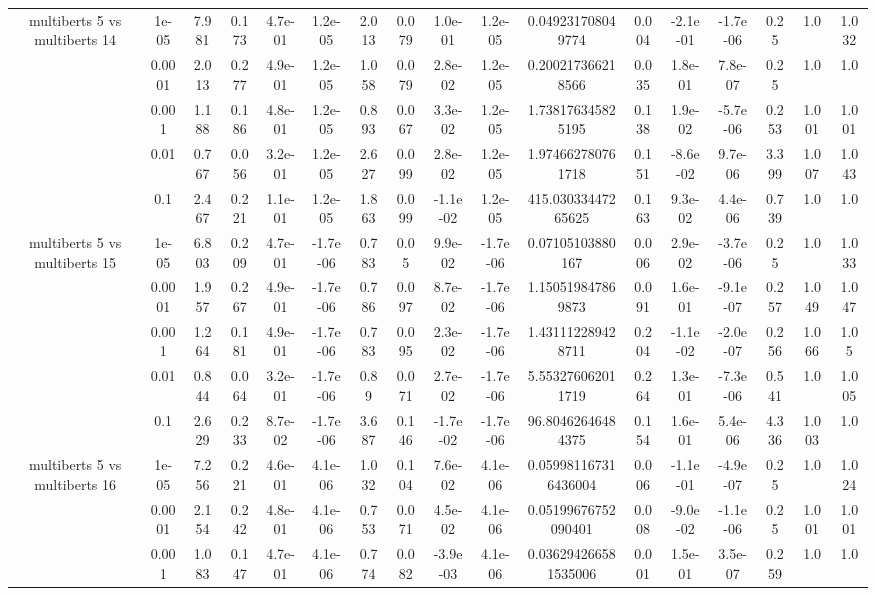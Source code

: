 \begin{tabular}{|c|c|c|c|c|c|c|c|c|c|c|c|c|c|c|c|c|}
\hline
\multirow{5}{*}{multiberts 5 vs multiberts 14} & 1e-05 & 7.981 & 0.173 & 4.7e-01 & 1.2e-05 & 2.013 & 0.079 & 1.0e-01 & 1.2e-05 & 0.049231708049774 & 0.004 & -2.1e-01 & -1.7e-06 & 0.25 & 1.0 & 1.032 \\
 & 0.0001 & 2.013 & 0.277 & 4.9e-01 & 1.2e-05 & 1.058 & 0.079 & 2.8e-02 & 1.2e-05 & 0.200217366218566 & 0.035 & 1.8e-01 & 7.8e-07 & 0.25 & 1.0 & 1.0 \\
 & 0.001 & 1.188 & 0.186 & 4.8e-01 & 1.2e-05 & 0.893 & 0.067 & 3.3e-02 & 1.2e-05 & 1.738176345825195 & 0.138 & 1.9e-02 & -5.7e-06 & 0.253 & 1.001 & 1.001 \\
 & 0.01 & 0.767 & 0.056 & 3.2e-01 & 1.2e-05 & 2.627 & 0.099 & 2.8e-02 & 1.2e-05 & 1.974662780761718 & 0.151 & -8.6e-02 & 9.7e-06 & 3.399 & 1.007 & 1.043 \\
 & 0.1 & 2.467 & 0.221 & 1.1e-01 & 1.2e-05 & 1.863 & 0.099 & -1.1e-02 & 1.2e-05 & 415.03033447265625 & 0.163 & 9.3e-02 & 4.4e-06 & 0.739 & 1.0 & 1.0 \\
\hline
\multirow{5}{*}{multiberts 5 vs multiberts 15} & 1e-05 & 6.803 & 0.209 & 4.7e-01 & -1.7e-06 & 0.783 & 0.05 & 9.9e-02 & -1.7e-06 & 0.07105103880167 & 0.006 & 2.9e-02 & -3.7e-06 & 0.25 & 1.0 & 1.033 \\
 & 0.0001 & 1.957 & 0.267 & 4.9e-01 & -1.7e-06 & 0.786 & 0.097 & 8.7e-02 & -1.7e-06 & 1.150519847869873 & 0.091 & 1.6e-01 & -9.1e-07 & 0.257 & 1.049 & 1.047 \\
 & 0.001 & 1.264 & 0.181 & 4.9e-01 & -1.7e-06 & 0.783 & 0.095 & 2.3e-02 & -1.7e-06 & 1.431112289428711 & 0.204 & -1.1e-02 & -2.0e-07 & 0.256 & 1.066 & 1.05 \\
 & 0.01 & 0.844 & 0.064 & 3.2e-01 & -1.7e-06 & 0.89 & 0.071 & 2.7e-02 & -1.7e-06 & 5.553276062011719 & 0.264 & 1.3e-01 & -7.3e-06 & 0.541 & 1.0 & 1.005 \\
 & 0.1 & 2.629 & 0.233 & 8.7e-02 & -1.7e-06 & 3.687 & 0.146 & -1.7e-02 & -1.7e-06 & 96.80462646484375 & 0.154 & 1.6e-01 & 5.4e-06 & 4.336 & 1.003 & 1.0 \\
\hline
\multirow{5}{*}{multiberts 5 vs multiberts 16} & 1e-05 & 7.256 & 0.221 & 4.6e-01 & 4.1e-06 & 1.032 & 0.104 & 7.6e-02 & 4.1e-06 & 0.059981167316436004 & 0.006 & -1.1e-01 & -4.9e-07 & 0.25 & 1.0 & 1.024 \\
 & 0.0001 & 2.154 & 0.242 & 4.8e-01 & 4.1e-06 & 0.753 & 0.071 & 4.5e-02 & 4.1e-06 & 0.05199676752090401 & 0.008 & -9.0e-02 & -1.1e-06 & 0.25 & 1.001 & 1.001 \\
 & 0.001 & 1.083 & 0.147 & 4.7e-01 & 4.1e-06 & 0.774 & 0.082 & -3.9e-03 & 4.1e-06 & 0.036294266581535006 & 0.001 & 1.5e-01 & 3.5e-07 & 0.259 & 1.0 & 1.0 \\

\end{tabular}
